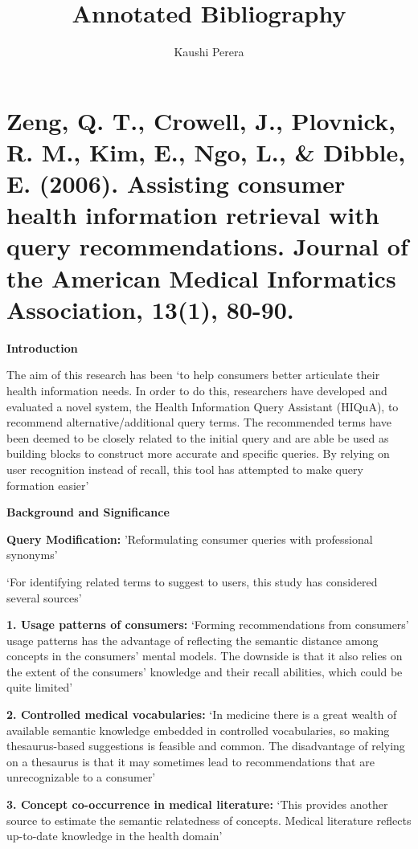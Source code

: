 \documentclass[]{article}
\title{Annotated Bibliography}
\author{Kaushi Perera}
\begin{document}
\maketitle


\section{Zeng, Q. T., Crowell, J., Plovnick, R. M., Kim, E., Ngo, L., \& Dibble, E. (2006). Assisting consumer health information retrieval with query recommendations. Journal of the American Medical Informatics Association, 13(1), 80-90.}

\textbf{Introduction}

The aim of this research has been ‘to help consumers better articulate their health information needs. In order to do this, researchers have developed and evaluated a novel system, the Health Information Query Assistant (HIQuA), to recommend alternative/additional query terms. The recommended terms have been deemed to be closely related to the initial query and are able be used as building blocks to construct more accurate and specific queries. By relying on user recognition instead of recall, this tool has attempted to make query formation easier’

\textbf{Background and Significance}

\textbf{Query Modification:} 'Reformulating consumer queries with professional synonyms’

‘For identifying related terms to suggest to users, this study has considered several sources’

\textbf{1.	Usage patterns of consumers:} ‘Forming recommendations from consumers’ usage patterns has the advantage of reflecting the semantic distance among concepts in the consumers’ mental models. The downside is that it also relies on the extent of the consumers’ knowledge and their recall abilities, which could be quite limited’

\textbf{2.	Controlled medical vocabularies:} ‘In medicine there is a great wealth of available semantic knowledge embedded in controlled vocabularies, so making thesaurus-based suggestions is feasible and common. The disadvantage of relying on a thesaurus is that it may sometimes lead to recommendations that are unrecognizable to a consumer’

\textbf{3.	Concept co-occurrence in medical literature:} ‘This provides another source to estimate the semantic relatedness of concepts. Medical literature reflects up-to-date knowledge in the health domain’
\end{document}
